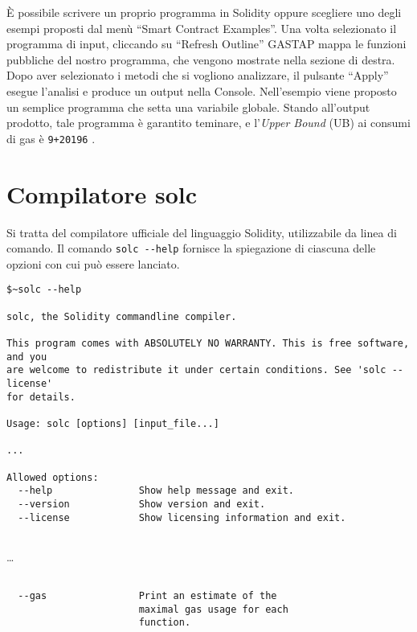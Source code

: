     \`E possibile scrivere un proprio programma in Solidity oppure scegliere uno degli esempi proposti dal menù ``Smart Contract Examples''.\newline
    \indent Una volta selezionato il programma di input, cliccando su ``Refresh Outline'' GASTAP mappa le funzioni pubbliche del nostro programma, che vengono mostrate nella sezione di destra. Dopo aver selezionato i metodi che si vogliono analizzare, il pulsante ``Apply'' esegue l'analisi e produce un output nella Console.\newline
    \indent Nell'esempio viene proposto un semplice programma che setta una variabile globale. Stando all'output prodotto, tale programma è garantito teminare, e l'\textit{Upper Bound} (UB) ai consumi di gas è \verb|9+20196| .

    

    
\section{Compilatore solc}

Si tratta del compilatore ufficiale del linguaggio Solidity, utilizzabile da linea di comando.\newline
\indent Il comando \verb|solc --help| fornisce la spiegazione di ciascuna delle opzioni con cui può essere lanciato.


\begin{lstlisting}
$~solc --help

solc, the Solidity commandline compiler.

This program comes with ABSOLUTELY NO WARRANTY. This is free software, and you
are welcome to redistribute it under certain conditions. See 'solc --license'
for details.

Usage: solc [options] [input_file...]

...

Allowed options:
  --help               Show help message and exit.
  --version            Show version and exit.
  --license            Show licensing information and exit.
    
\end{lstlisting}    
    
\ldots

\begin{lstlisting}[frame=single, 
                    framerule=0pt]

  --gas                Print an estimate of the  
                       maximal gas usage for each 
                       function. 
 
\end{lstlisting}


